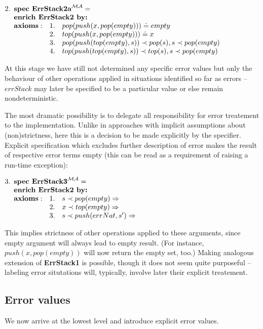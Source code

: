 \documentclass[10pt]{article}
\begin{document}
\(
2. \spec{	\tit{\mbox{\bf spec\ ErrStack2a}^{\inst{MA}}=} \\
	\tit{\mbox{\bf enrich\ ErrStack2\  by:}} \\
	 	{\bf axioms:}
			&1.& pop(push(x,pop(empty)))\eleq empty \\
			&2.& top(push(x,pop(empty)))\eleq x \\
			&3.& pop(push(top(empty),s))\prec pop(s), s\prec pop(empty) \\
			&4.& top(push(top(empty),s))\prec top(s), s\prec pop(empty) 
}
\)

\noindent
At this stage we have still not determined any specific error values but only 
the behaviour of other operations applied in situations identified so far as
errors 
-- $errStack$ may later be specified to be a particular value or else remain nondeterministic.

The most dramatic possibility is to delegate all responsibility for error
treatement to the implementation. Unlike in approaches with implicit
assumptions about (non)strictness, here this is a decision to be made explicitly by the
specifier. 
Explicit specification which excludes further
description of error makes the result of respective error terms empty (this
can be read as a requirement of raising a run-time exception): \vspace*{1ex}

\(
3. \spec{	\tit{\mbox{\bf spec\ ErrStack3}^{\inst{MA}}=} \\
	\tit{\mbox{\bf enrich\ ErrStack2\  by:}} \\
	 	{\bf axioms:}
			&1.& s \prec pop(empty) \To  \\
			&2.& x \prec top(empty) \To \\
			&3.& s \prec push(errNat,s') \To
}
\)

\noindent
This implies strictness of other operations applied to these
arguments, since empty argument will always lead to empty result.  (For
instance, $push(x,pop(empty))$ will now return the empty set, too.) Making
analogous extension of {\bf ErrStack1} is possible, though it does not seem
quite purposeful -- labeling error situtations will, typically, involve later
their explicit treatement.

\subsection{Error values}\label{subsub:er4}
We now arrive at the lowest level and introduce explicit error values.
\end{document}
